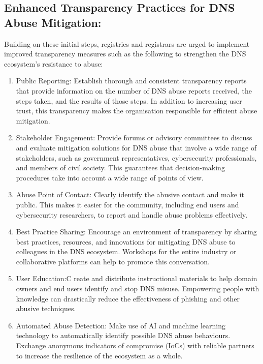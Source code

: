 \subsection{Enhanced Transparency Practices for DNS Abuse Mitigation: }

Building on these initial steps, registries and registrars are urged to implement improved transparency measures such as the following to strengthen the DNS ecosystem's resistance to abuse:

\begin{enumerate}
    \item Public Reporting: Establish thorough and consistent transparency reports that provide information on the number of DNS abuse reports received, the steps taken, and the results of those steps. In addition to increasing user trust, this transparency makes the organisation responsible for efficient abuse mitigation.

    \item Stakeholder Engagement: Provide forums or advisory committees to discuss and evaluate mitigation solutions for DNS abuse that involve a wide range of stakeholders, such as government representatives, cybersecurity professionals, and members of civil society. This guarantees that decision-making procedures take into account a wide range of points of view.

    \item Abuse Point of Contact: Clearly identify the abusive contact and make it public. This makes it easier for the community, including end users and cybersecurity researchers, to report and handle abuse problems effectively.

    \item Best Practice Sharing: Encourage an environment of transparency by sharing best practices, resources, and innovations for mitigating DNS abuse to colleagues in the DNS ecosystem. Workshops for the entire industry or collaborative platforms can help to promote this conversation.

    \item User Education:C reate and distribute instructional materials to help domain owners and end users identify and stop DNS misuse. Empowering people with knowledge can drastically reduce the effectiveness of phishing and other abusive techniques.

    \item Automated Abuse Detection: Make use of AI and machine learning technology to automatically identify possible DNS abuse behaviours. Exchange anonymous indicators of compromise (IoCs) with reliable partners to increase the resilience of the ecosystem as a whole.

\end{enumerate}


